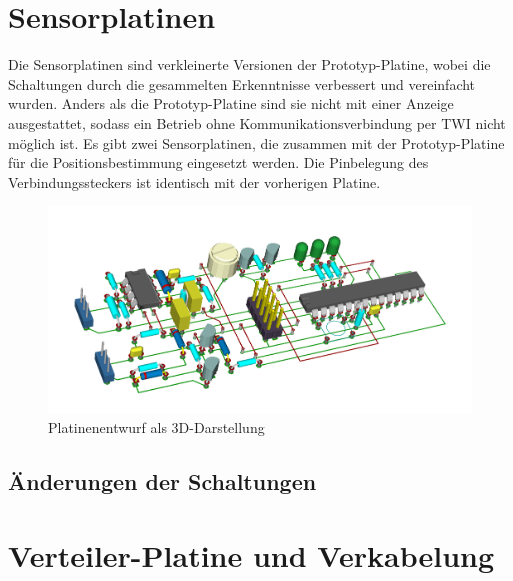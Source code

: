 \section{Sensorplatinen}
Die Sensorplatinen sind verkleinerte Versionen der Prototyp-Platine, wobei die Schaltungen durch die gesammelten Erkenntnisse verbessert und vereinfacht wurden. Anders als die Prototyp-Platine sind sie nicht mit einer Anzeige ausgestattet, sodass ein Betrieb ohne Kommunikationsverbindung per \ac{TWI} nicht möglich ist. Es gibt zwei Sensorplatinen, die zusammen mit der Prototyp-Platine für die Positionsbestimmung eingesetzt werden. Die Pinbelegung des Verbindungssteckers ist identisch mit der vorherigen Platine.

\begin{figure}[H]
	\centering
	\includegraphics[width=(\textwidth)]{images/endplatine_3d.png}
	\caption{Platinenentwurf als 3D-Darstellung} \label{img:endplatine3d}
\end{figure}


\subsection{Änderungen der Schaltungen}



\section{Verteiler-Platine und Verkabelung}



